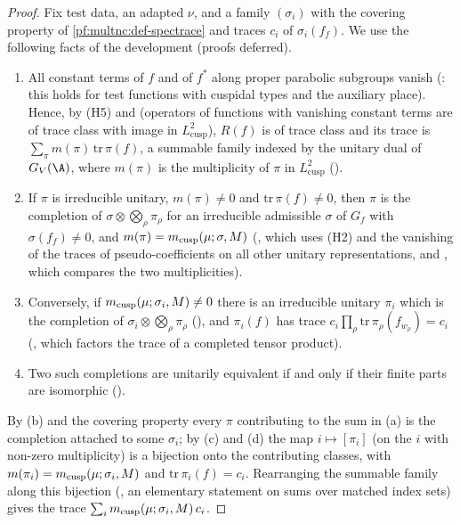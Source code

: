 \begin{proof}
Fix test data, an adapted $\nu$, and a family $(\sigma_i)$ with the covering property of \cref{pf:multnc:def-spectrace}
and traces $c_i$ of $\sigma_i(f_f)$. We use the following facts of the development (proofs deferred).
\begin{enumerate}[label=(\alph*)]
\item All constant terms of $f$ and of $f^*$ along proper parabolic subgroups vanish
(: this holds for test functions with cuspidal types and the auxiliary place).
Hence, by (H5) and  (operators of
functions with vanishing constant terms are of trace class with image in $L^2_{\mathrm{cusp}}$), $R(f)$ is of trace class
and its trace is $\sum_\pi m(\pi)\,\mathrm{tr}\,\pi(f)$, a summable family indexed by the unitary dual of $G_V(\A)$, where
$m(\pi)$ is the multiplicity of $\pi$ in $L^2_{\mathrm{cusp}}$ ().
\item If $\pi$ is irreducible unitary, $m(\pi)\ne0$ and $\mathrm{tr}\,\pi(f)\ne0$, then $\pi$ is the completion of
$\sigma\otimes\bigotimes_\rho\pi_\rho$ for an irreducible admissible $\sigma$ of $G_f$ with $\sigma(f_f)\ne0$, and
$m(\pi)=m_{\mathrm{cusp}}(\mu;\sigma,M)$ (, which uses (H2) and the vanishing of the
traces of pseudo-coefficients on all other unitary representations, and
, which compares the two multiplicities).
\item Conversely, if $m_{\mathrm{cusp}}(\mu;\sigma_i,M)\ne0$ there is an irreducible unitary $\pi_i$ which is the completion of
$\sigma_i\otimes\bigotimes_\rho\pi_\rho$ (),
and $\pi_i(f)$ has trace $c_i\prod_\rho\mathrm{tr}\,\pi_\rho(f_{w_\rho})=c_i$ (,
which factors the trace of a completed tensor product).
\item Two such completions are unitarily equivalent if and only if their finite parts are isomorphic
().
\end{enumerate}
By (b) and the covering property every $\pi$ contributing to the sum in (a) is the completion attached to some $\sigma_i$; by
(c) and (d) the map $i\mapsto[\pi_i]$ (on the $i$ with non-zero multiplicity) is a bijection onto the contributing classes,
with $m(\pi_i)=m_{\mathrm{cusp}}(\mu;\sigma_i,M)$ and $\mathrm{tr}\,\pi_i(f)=c_i$. Rearranging the summable family along this
bijection (, an elementary statement on sums over matched
index sets) gives the trace $\sum_im_{\mathrm{cusp}}(\mu;\sigma_i,M)\,c_i$.
\end{proof}

